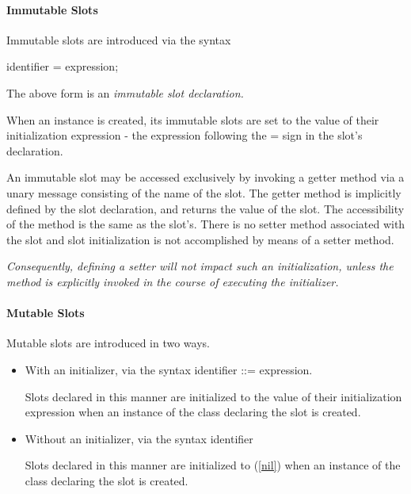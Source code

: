 \documentclass{article}
\newcommand{\code}[1]{{\sf #1}}
\begin{document}
\paragraph{Immutable Slots}
\label{immutableSlots}

Immutable slots are introduced via the syntax
\begin{newspeak}
identifier = expression;
\end{newspeak}

The above form is an {\em immutable slot declaration.}

When an instance is created, its immutable slots are set to the value of their initialization expression - the expression following the = sign in the slot's declaration.

An immutable slot may be accessed exclusively by invoking a getter method via a unary message consisting of the name of the slot. The getter method is implicitly defined by the slot declaration, and returns the value of the slot. The accessibility of the method is the same as the slot's. There is no setter method associated with the slot and slot initialization is not accomplished by means of a setter method.

{\it
Consequently, defining a setter will not impact such an initialization, unless the method is explicitly invoked in the course of executing the initializer.
}


\paragraph{Mutable Slots}
\label{mutableSlots}

Mutable slots are introduced in two ways.
\begin{itemize}
\item
With an initializer,  via the syntax \code{identifier ::= expression.}
%

Slots declared in this manner are initialized to the value of their initialization expression when an instance of the class declaring the slot is created.
\item
Without an initializer, via the syntax \code{identifier}

Slots declared in this manner are initialized to \NIL{ } (\ref{nil}) when an instance of the class declaring the slot is created.
\end{itemize}
\end{document}
